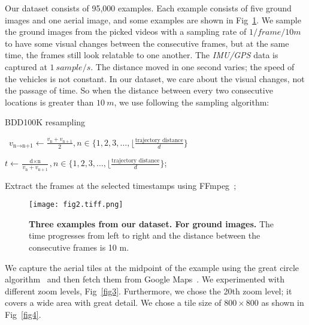 \documentclass[10pt,letterpaper]{article}
\begin{document}
Our dataset consists of 95,000 examples. Each example consists of five ground images and one aerial image, and some examples are shown in Fig~\ref{fig2}. We sample the ground images from the picked videos with a sampling rate of $1 / frame/10 m$ to have some visual changes between the consecutive frames, but at the same time, the frames still look relatable to one another. The \emph{IMU/GPS} data is captured at $1 \ sample/s$. The distance moved in one second varies; the speed of the vehicles is not constant. In our dataset, we care about the visual changes, not the passage of time. So when the distance between every two consecutive locations is greater than $10 \ m$,  we use following the sampling algorithm:

\begin{algorithm}[!h]
\caption{BDD100K resampling}
\
$v_{\text{n} \to \text{n+1}} \gets \frac{v_{\text{n}} + v_{\text{n} + 1}}{2}, n \in \{1, 2, 3, \text{\ldots}, \lfloor\frac{\text{trajectory distance}}{d} \}$ \;

\Comment{To get the timestamp of the nth frame ($t_{\text{n}}$)}

$t \gets \frac{\text{d} \times  \text{n}}{v_{\text{n}} + v_{\text{n} + 1}} , n \in \{1, 2, 3, \text{\ldots}, \lfloor\frac{\text{trajectory distance}}{d} \} $;\

Extract the frames at the selected timestamps using FFmpeg~\cite{bib23};\
\end{algorithm}

\begin{figure}[!ht]
  \caption{{\bf Three examples from our dataset. For ground images.} The time progresses from left to right and the distance between the consecutive frames is 10 m.}
  \texttt{[image: fig2.tiff.png]}
  \label{fig2}
\end{figure}

We capture the aerial tiles at the midpoint of the example using the great circle algorithm~\cite{bib16} and then fetch them from Google Maps~\cite{bib15}. We experimented with different zoom levels, Fig~\ref{fig3}. Furthermore, we chose the 20th zoom level; it covers a wide area with great detail. We chose a tile size of  $800 \times 800$ as shown in Fig~\ref{fig4}.
\end{document}
